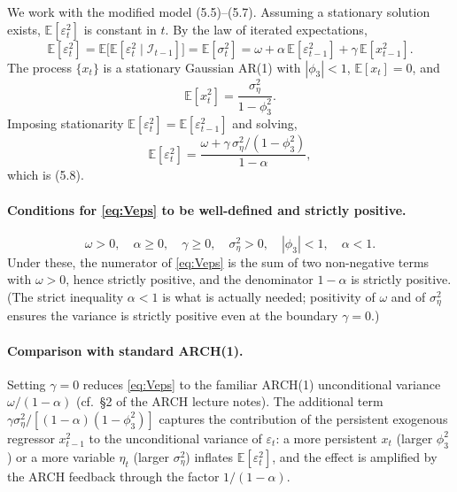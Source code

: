 \documentclass[12pt]{article}
\newcommand{\E}{\mathbb{E}}
\newcommand{\Info}{\mathcal{I}}
\begin{document}
We work with the modified model (5.5)--(5.7). Assuming a stationary solution exists, $\E[\varepsilon_t^2]$ is constant in $t$. By the law of iterated expectations,
\begin{equation*}
\E[\varepsilon_t^2]
= \E\!\big[\E[\varepsilon_t^2\mid\Info_{t-1}]\big]
= \E[\sigma_t^2]
= \omega + \alpha\,\E[\varepsilon_{t-1}^2] + \gamma\,\E[x_{t-1}^2].
\end{equation*}
The process $\{x_t\}$ is a stationary Gaussian AR(1) with $|\phi_3|<1$, $\E[x_t]=0$, and
\begin{equation}
\E[x_t^2] = \frac{\sigma_\eta^2}{1-\phi_3^2}.\label{eq:Vx}
\end{equation}
Imposing stationarity $\E[\varepsilon_t^2]=\E[\varepsilon_{t-1}^2]$ and solving,
\begin{equation}
\E[\varepsilon_t^2] = \frac{\omega+\gamma\,\sigma_\eta^2/(1-\phi_3^2)}{1-\alpha},\label{eq:Veps}
\end{equation}
which is (5.8).

\paragraph{Conditions for \eqref{eq:Veps} to be well-defined and strictly positive.}
\begin{equation*}
\omega>0,\quad \alpha\geq 0,\quad \gamma\geq 0,\quad \sigma_\eta^2>0,\quad |\phi_3|<1,\quad \alpha<1.
\end{equation*}
Under these, the numerator of \eqref{eq:Veps} is the sum of two non-negative terms with $\omega>0$, hence strictly positive, and the denominator $1-\alpha$ is strictly positive. (The strict inequality $\alpha<1$ is what is actually needed; positivity of $\omega$ and of $\sigma_\eta^2$ ensures the variance is strictly positive even at the boundary $\gamma=0$.)

\paragraph{Comparison with standard ARCH(1).} Setting $\gamma=0$ reduces \eqref{eq:Veps} to the familiar ARCH(1) unconditional variance $\omega/(1-\alpha)$ (cf.\ \S2 of the ARCH lecture notes). The additional term $\gamma\sigma_\eta^2/[(1-\alpha)(1-\phi_3^2)]$ captures the contribution of the persistent exogenous regressor $x_{t-1}^2$ to the unconditional variance of $\varepsilon_t$: a more persistent $x_t$ (larger $\phi_3^2$) or a more variable $\eta_t$ (larger $\sigma_\eta^2$) inflates $\E[\varepsilon_t^2]$, and the effect is amplified by the ARCH feedback through the factor $1/(1-\alpha)$.
\end{document}
